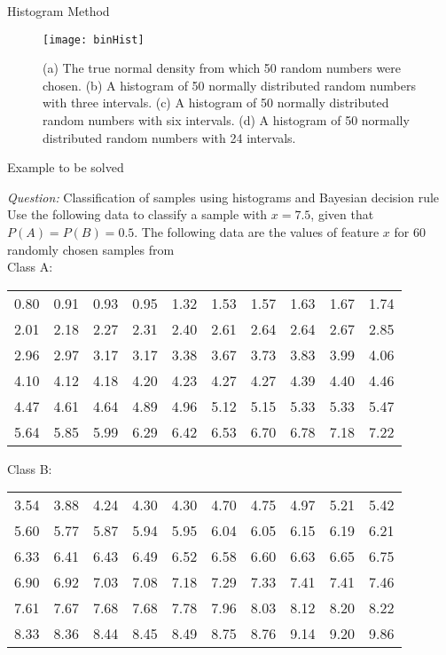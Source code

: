 \begin{frame}{Histogram Method}
\begin{figure}
\texttt{[image: binHist]}
\caption{{\scriptsize (a) The true normal density from which 50 random numbers were chosen. (b) A histogram of 50 normally distributed random numbers with three intervals.  (c) A histogram of 50 normally distributed random numbers with six intervals. (d) A histogram of 50 normally distributed random numbers with 24 intervals.}}
\end{figure}
\end{frame}

\begin{frame}{Example to be solved}
\begin{footnotesize}
\textit{\color{mycolor1}Question:} Classification of samples using histograms and Bayesian decision rule\\
Use the following data to classify a sample with $x=7.5$, given that $P(A)=P(B)=0.5$. The following data are the values of feature $x$ for 60 randomly chosen samples from \\
Class A:
\begin{table}
\begin{scriptsize}
\begin{tabular}{cccccccccc}
0.80& 0.91& 0.93& 0.95& 1.32& 1.53& 1.57& 1.63& 1.67& 1.74\\
     2.01& 2.18& 2.27& 2.31& 2.40& 2.61& 2.64& 2.64& 2.67& 2.85\\
     2.96& 2.97& 3.17& 3.17& 3.38& 3.67& 3.73& 3.83& 3.99& 4.06\\
     4.10& 4.12& 4.18& 4.20& 4.23& 4.27& 4.27& 4.39& 4.40& 4.46\\
     4.47& 4.61& 4.64& 4.89& 4.96& 5.12& 5.15& 5.33& 5.33& 5.47\\
     5.64& 5.85& 5.99& 6.29& 6.42& 6.53& 6.70& 6.78& 7.18& 7.22\\
\end{tabular}
\end{scriptsize}
\end{table}

Class B:
\begin{table}
\begin{scriptsize}
\begin{tabular}{cccccccccc}
3.54& 3.88& 4.24& 4.30& 4.30& 4.70& 4.75& 4.97& 5.21& 5.42\\
     5.60& 5.77& 5.87& 5.94& 5.95& 6.04& 6.05& 6.15& 6.19& 6.21\\
     6.33& 6.41& 6.43& 6.49& 6.52& 6.58& 6.60& 6.63& 6.65& 6.75\\
     6.90& 6.92& 7.03& 7.08& 7.18& 7.29& 7.33& 7.41& 7.41& 7.46\\
     7.61& 7.67& 7.68& 7.68& 7.78& 7.96& 8.03& 8.12& 8.20& 8.22\\
     8.33& 8.36& 8.44& 8.45& 8.49& 8.75& 8.76& 9.14& 9.20& 9.86
\end{tabular}
\end{scriptsize}
\end{table}
\end{footnotesize}
\end{frame}

